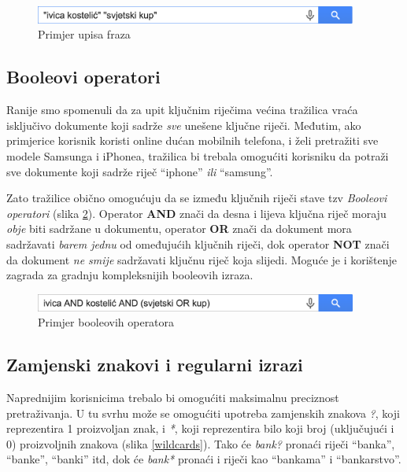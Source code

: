 \documentclass[a4paper,twoside,12pt]{scrreprt}
\begin{document}
\begin{figure}[H]
  \centering
  \includegraphics[width=300pt]{phrases}
  \caption{Primjer upisa fraza}
  \label{phrases}
\end{figure}

\subsection{Booleovi operatori}

Ranije smo spomenuli da za upit ključnim riječima većina tražilica vraća isključivo dokumente koji sadrže \textit{sve} unešene ključne riječi. Međutim, ako primjerice korisnik koristi online dućan mobilnih telefona, i želi pretražiti sve modele Samsunga i iPhonea, tražilica bi trebala omogućiti korisniku da potraži sve dokumente koji sadrže riječ ``iphone'' \textit{ili} ``samsung''.

Zato tražilice obično omogućuju da se između ključnih riječi stave tzv \textit{Booleovi operatori} (slika \ref{boolean}). Operator \textbf{AND} znači da desna i lijeva ključna riječ moraju \textit{obje} biti sadržane u dokumentu, operator \textbf{OR} znači da dokument mora sadržavati \textit{barem jednu} od omeđujućih ključnih riječi, dok operator \textbf{NOT} znači da dokument \textit{ne smije} sadržavati ključnu riječ koja slijedi. Moguće je i korištenje zagrada za gradnju kompleksnijih booleovih izraza.

\begin{figure}[H]
  \centering
  \includegraphics[width=300pt]{boolean}
  \caption{Primjer booleovih operatora}
  \label{boolean}
\end{figure}

\subsection{Zamjenski znakovi i regularni izrazi}

Naprednijim korisnicima trebalo bi omogućiti maksimalnu preciznost pretraživanja. U tu svrhu može se omogućiti upotreba zamjenskih znakova \textit{?}, koji reprezentira 1 proizvoljan znak, i \textit{*}, koji reprezentira bilo koji broj (uključujući i 0) proizvoljnih znakova (slika \ref{wildcards}). Tako će \textit{bank?} pronaći riječi ``banka'', ``banke'', ``banki'' itd, dok će \textit{bank*} pronaći i riječi kao ``bankama'' i ``bankarstvo''.
\end{document}

